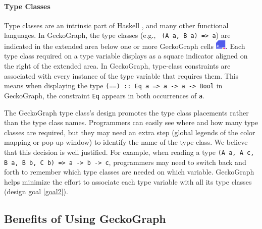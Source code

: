\paragraph{Type Classes} 
Type classes are an intrinsic part of Haskell \cite{Hudak2007-kn}, and many other functional languages. In GeckoGraph, the type classes (e.g., \texttt{ (A a, B a) => a}) are indicated in the extended area below one or more GeckoGraph cells \includegraphics[height=1.2em]{figures/TypeClass.png}. Each type class required on a type variable displays as a square indicator aligned on the right of the extended area. In GeckoGraph, type-class constraints are associated with every instance of the type variable that requires them. This means when displaying the type \texttt{(==) :: Eq a => a -> a -> Bool} in GeckoGraph, the constraint \texttt{Eq} appears in both occurrences of \texttt{a}. 

The GeckoGraph type class's design promotes the type class placements rather than the type class names. Programmers can easily see where and how many type classes are required, but they may need an extra step (global legends of the color mapping or pop-up window) to identify the name of the type class. We believe that this decision is well justified. For example, when reading a type \texttt{(A a, A c, B a, B b, C b) => a -> b -> c}, programmers may need to switch back and forth to remember which type classes are needed on which variable. GeckoGraph helps minimize the effort to associate each type variable with all its type classes (design goal \ref{goal2}). 



\subsection{Benefits of Using GeckoGraph}\label{sec:benefits}
